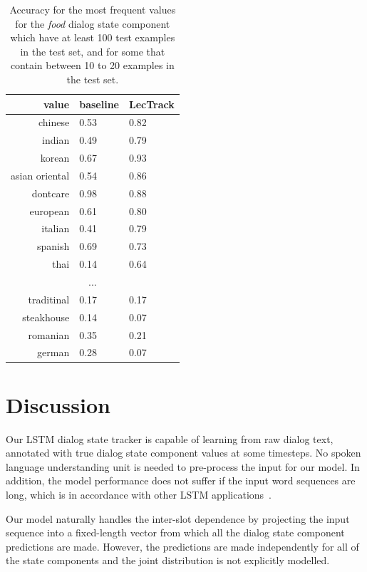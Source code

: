 \documentclass[10pt,twocolumn]{article}
\begin{document}
\begin{table}
    \centering
    \begin{tabular}{|r|ll|}
    \hline
               value & baseline & LecTrack \\
    \hline
             chinese   & 0.53   & 0.82   \\
              indian   & 0.49   & 0.79   \\
              korean   & 0.67   & 0.93   \\
      asian oriental   & 0.54   & 0.86   \\
            dontcare   & 0.98   & 0.88   \\
            european   & 0.61   & 0.80   \\
             italian   & 0.41   & 0.79   \\
             spanish   & 0.69   & 0.73   \\
                thai   & 0.14   & 0.64   \\
    \multicolumn{3}{|c|}{...} \\
                traditinal  & 0.17  & 0.17 \\
               steakhouse   & 0.14  & 0.07 \\
                romanian    & 0.35  & 0.21 \\
                german      & 0.28  & 0.07 \\
    \hline
    \end{tabular}

    \medskip
    \caption{Accuracy for the most frequent values for the \emph{food} dialog state component which have at least 100 test examples in the test set, and for some that contain between 10 to 20 examples in the test set.}
    \label{table:resultsFreq}
\end{table}

\section{Discussion}
\label{sec:discussion}
Our LSTM dialog state tracker is capable of learning from raw dialog text, annotated with true dialog state component values at some timesteps. No spoken language understanding unit is needed to pre-process the input for our model. In addition, the model performance does not suffer if the input word sequences are long, which is in accordance with other LSTM applications~\cite{sutskever2014sequence}.

Our model naturally handles the inter-slot dependence by projecting the input sequence into a fixed-length vector from which all the dialog state component predictions are made. However, the predictions are made independently for all of the state components and the joint distribution is not explicitly modelled.
\end{document}
